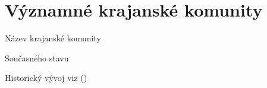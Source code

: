 \hypertarget{vuxfdznamnuxe9-krajanskuxe9-komunity}{%
\chapter{Významné krajanské komunity}\label{vuxfdznamnuxe9-krajanskuxe9-komunity}}

Název krajanské komunity

Současného stavu

Historický vývoj viz ()
